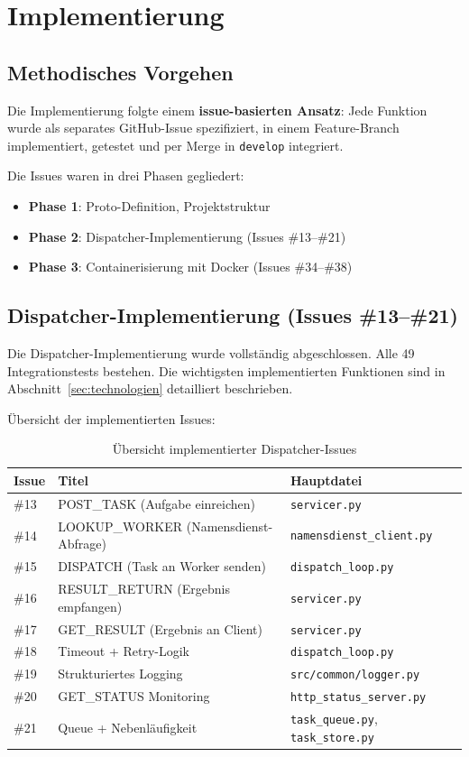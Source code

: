 \section{Implementierung}

\subsection{Methodisches Vorgehen}

Die Implementierung folgte einem \textbf{issue-basierten Ansatz}:
Jede Funktion wurde als separates GitHub-Issue spezifiziert,
in einem Feature-Branch implementiert, getestet und per Merge
in \texttt{develop} integriert.

Die Issues waren in drei Phasen gegliedert:
\begin{itemize}
  \item \textbf{Phase 1}: Proto-Definition, Projektstruktur
  \item \textbf{Phase 2}: Dispatcher-Implementierung (Issues \#13--\#21)
  \item \textbf{Phase 3}: Containerisierung mit Docker (Issues \#34--\#38)
\end{itemize}

\subsection{Dispatcher-Implementierung (Issues \#13--\#21)}

Die Dispatcher-Implementierung wurde vollständig abgeschlossen.
Alle 49 Integrationstests bestehen.
Die wichtigsten implementierten Funktionen sind in
Abschnitt~\ref{sec:technologien} detailliert beschrieben.

Übersicht der implementierten Issues:

\begin{table}[H]
\centering
\begin{tabular}{lll}
\toprule
\textbf{Issue} & \textbf{Titel} & \textbf{Hauptdatei} \\
\midrule
\#13 & POST\_TASK (Aufgabe einreichen)       & \texttt{servicer.py} \\
\#14 & LOOKUP\_WORKER (Namensdienst-Abfrage) & \texttt{namensdienst\_client.py} \\
\#15 & DISPATCH (Task an Worker senden)      & \texttt{dispatch\_loop.py} \\
\#16 & RESULT\_RETURN (Ergebnis empfangen)   & \texttt{servicer.py} \\
\#17 & GET\_RESULT (Ergebnis an Client)      & \texttt{servicer.py} \\
\#18 & Timeout + Retry-Logik                 & \texttt{dispatch\_loop.py} \\
\#19 & Strukturiertes Logging                & \texttt{src/common/logger.py} \\
\#20 & GET\_STATUS Monitoring                & \texttt{http\_status\_server.py} \\
\#21 & Queue + Nebenläufigkeit               & \texttt{task\_queue.py}, \texttt{task\_store.py} \\
\bottomrule
\end{tabular}
\caption{Übersicht implementierter Dispatcher-Issues}
\end{table}

